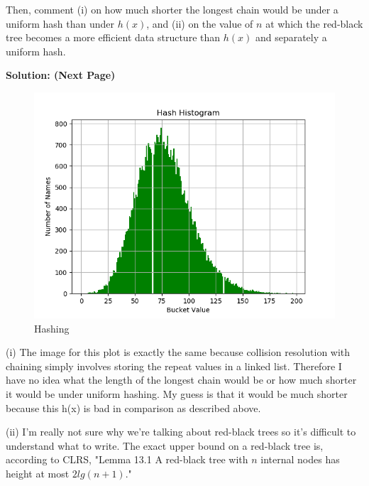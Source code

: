 \documentclass[12pt]{article}
\begin{document}
\begin{enumerate}
\begin{enumerate}
        Then, comment (i) on how much shorter the longest chain would be under a uniform hash than under $h(x)$, and (ii) on 
        the value of $n$ at which the red-black tree becomes a more efficient data structure than $h(x)$ and separately a uniform 
        hash.\par
        \textbf{Solution: (Next Page)}\par
        \newpage
        \begin{figure}[!h]
            \centering
            \includegraphics{PS4_Histo.png}
            \caption{Hashing}
        \end{figure}
            (i) The image for this plot is exactly the same because collision resolution with chaining simply involves storing the repeat 
            values in a linked list. Therefore I have no idea what the length of the longest chain would be or how much shorter it would be 
            under uniform hashing. My guess is that it would be much shorter because this h(x) is bad in comparison as described above.\par
            (ii) I'm really not sure why we're talking about red-black trees so it's difficult to understand what to write. The exact upper
            bound on a red-black tree is, according to CLRS, "Lemma 13.1
            A red-black tree with $n$ internal nodes has height at most $2lg(n+1)$." \par

	\end{enumerate}


\end{enumerate}
\end{document}
